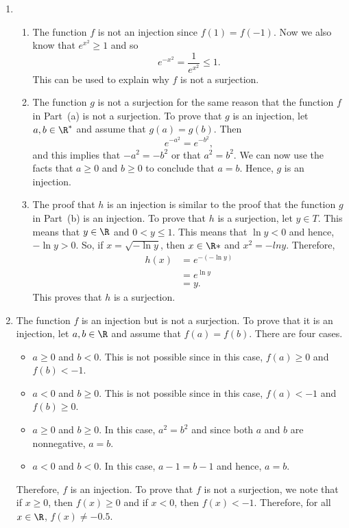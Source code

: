 \begin{enumerate}
\item \begin{enumerate}
\item The function $f$ is not an injection since $f(1) = f(-1)$.  Now we also know that 
$e^{x^2} \geq 1$ and so
\[
e^{-x^2} = \frac{1}{e^{x^2}} \leq 1.
\]
This can be used to explain why $f$ is not a surjection.

\item The function $g$ is not a surjection for the same reason that the function $f$ in Part~(a) is not a surjection.  To prove that $g$ is an injection, let $a, b \in \R^*$ and assume that 
$g(a) = g(b)$.  Then
\[
e^{-a^2} = e^{-b^2},
\]
and this implies that $-a^2 = -b^2$ or that $a^2 = b^2$.  We can now use the facts that 
$a \geq 0$ and $b \geq 0$ to conclude that $a = b$.  Hence, $g$ is an injection.

\item The proof that $h$ is an injection is similar to the proof that the function $g$ in 
Part~(b) is an injection.  To prove that $h$ is a surjection, let $y \in T$.  This means that 
$y \in \R$ and $0 < y \leq 1$.  This means that $\ln y < 0$ and hence, $-\ln y > 0$.  So, if 
$x = \sqrt{-\ln y}$, then $x \in \R*$ and $x^2 = -ln y$.  Therefore,
\begin{align*}
h(x) &=  e^{-(-\ln y)} \\
     &= e^{\ln y} \\
     &= y.
\end{align*}
This proves that $h$ is a surjection.
\end{enumerate}


\item The function $f$ is an injection but is not a surjection.  To prove that it is an injection, let $a, b \in \R$ and assume that $f(a) = f(b)$.  There are four cases.
\begin{itemize}
\item $a \geq 0$ and $b < 0$.  This is not possible since in this case, $f(a) \geq 0$ and 
$f(b) < -1$.
\item $a < 0$ and $b \geq 0$.  This is not possible since in this case, $f(a) < -1$ and 
$f(b) \geq 0$.
\item $a \geq 0$ and $b \geq 0$.  In this case, $a^2 = b^2$ and since both $a$ and $b$ are nonnegative, $a = b$.
\item $a < 0$ and $b < 0$.  In this case, $a - 1 = b - 1$ and hence, $a = b$.
\end{itemize}
Therefore, $f$ is an injection.  To prove that $f$ is not a surjection, we note that if 
$x \geq 0$, then $f(x) \geq 0$ and if $x < 0$, then $f(x) < -1$.  Therefore, for all 
$x \in \R$, $f(x) \ne -0.5$.





\end{enumerate}
